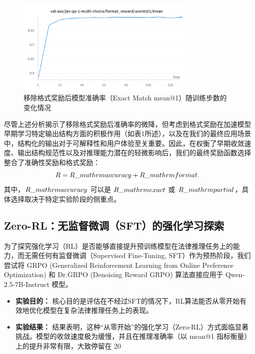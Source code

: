 \documentclass{pkuthesis}
\begin{document}
\begin{figure}[h]
\centering
\includegraphics[width=0.8\textwidth]{figures/format.png}
\caption{移除格式奖励后模型准确率（Exact Match mean@1）随训练步数的变化情况}
\label{fig:format}
\end{figure}

尽管上述分析揭示了移除格式奖励后准确率的微降，但考虑到格式奖励在加速模型早期学习特定输出结构方面的积极作用（如表1所述），以及在我们的最终应用场景中，结构化的输出对于可解释性和用户体验至关重要。因此，在权衡了早期收敛速度、输出结构规范性以及对推理能力潜在的轻微影响后，我们的最终奖励函数选择整合了准确性奖励和格式奖励：
\begin{equation}
R = R\_{\\mathrm{accuracy}} + R\_{\\mathrm{format}}.
\end{equation}
其中，$R\_{\\mathrm{accuracy}}$ 可以是 $R\_{\\mathrm{exact}}$ 或 $R\_{\\mathrm{partial}}$，具体选择取决于特定实验阶段的侧重点。

\subsection{Zero-RL：无监督微调（SFT）的强化学习探索}
为了探究强化学习（RL）是否能够直接提升预训练模型在法律推理任务上的能力，而无需任何有监督微调（Supervised Fine-Tuning, SFT）作为预热阶段，我们尝试将 GRPO (Generalized Reinforcement Learning from Online Preference Optimization) 和 Dr.GRPO (Denoising Reward GRPO) 算法直接应用于 Qwen-2.5-7B-Instruct 模型。
\begin{itemize}
\item \textbf{实验目的：} 核心目的是评估在不经过SFT的情况下，RL算法能否从零开始有效地优化模型在复杂法律推理任务上的表现。
\item \textbf{实验结果：} 结果表明，这种“从零开始”的强化学习（Zero-RL）方式面临显著挑战。模型的收敛速度极为缓慢，并且在推理准确率（以 mean@1 指标衡量）上的提升非常有限，大致停留在 20%
\end{itemize}
\end{document}
